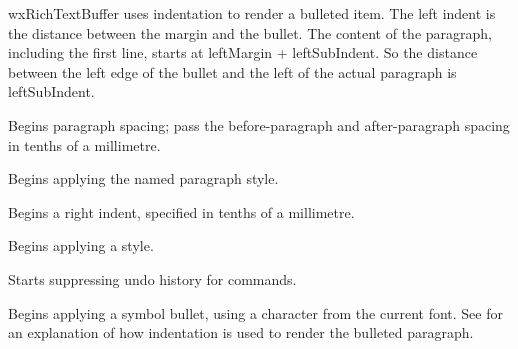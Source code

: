 wxRichTextBuffer uses indentation to render a bulleted item. The left indent is the distance between
the margin and the bullet. The content of the paragraph, including the first line, starts
at leftMargin + leftSubIndent. So the distance between the left edge of the bullet and the
left of the actual paragraph is leftSubIndent.

\label{wxrichtextctrlbeginparagraphspacing}


Begins paragraph spacing; pass the before-paragraph and after-paragraph spacing in tenths of
a millimetre.

\label{wxrichtextctrlbeginparagraphstyle}


Begins applying the named paragraph style.

\label{wxrichtextctrlbeginrightindent}


Begins a right indent, specified in tenths of a millimetre.

\label{wxrichtextctrlbeginstyle}


Begins applying a style.

\label{wxrichtextctrlbeginsuppressundo}


Starts suppressing undo history for commands.

\label{wxrichtextctrlbeginsymbolbullet}


Begins applying a symbol bullet, using a character from the current font. See  for
an explanation of how indentation is used to render the bulleted paragraph.

